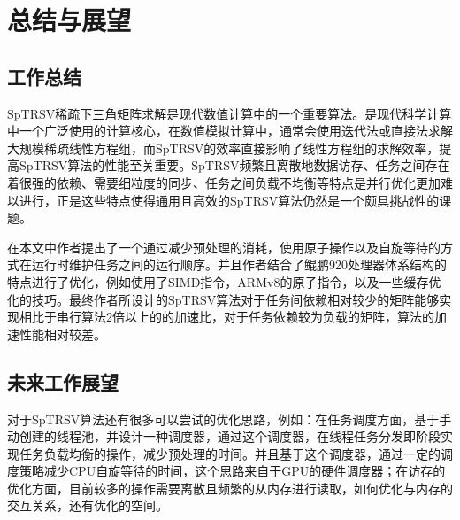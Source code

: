 \chapter{总结与展望}


\section{工作总结}

SpTRSV稀疏下三角矩阵求解是现代数值计算中的一个重要算法。是现代科学计算中一个广泛使用的计算核心，在数值模拟计算中，通常会使用迭代法或直接法求解大规模稀疏线性方程组，而SpTRSV的效率直接影响了线性方程组的求解效率，提高SpTRSV算法的性能至关重要。SpTRSV频繁且离散地数据访存、任务之间存在着很强的依赖、需要细粒度的同步、任务之间负载不均衡等特点是并行优化更加难以进行，正是这些特点使得通用且高效的SpTRSV算法仍然是一个颇具挑战性的课题。

在本文中作者提出了一个通过减少预处理的消耗，使用原子操作以及自旋等待的方式在运行时维护任务之间的运行顺序。并且作者结合了鲲鹏920处理器体系结构的特点进行了优化，例如使用了SIMD指令，ARMv8的原子指令，以及一些缓存优化的技巧。最终作者所设计的SpTRSV算法对于任务间依赖相对较少的矩阵能够实现相比于串行算法2倍以上的的加速比，对于任务依赖较为负载的矩阵，算法的加速性能相对较差。


\section{未来工作展望}

对于SpTRSV算法还有很多可以尝试的优化思路，例如：在任务调度方面，基于手动创建的线程池，并设计一种调度器，通过这个调度器，在线程任务分发即阶段实现任务负载均衡的操作，减少预处理的时间。并且基于这个调度器，通过一定的调度策略减少CPU自旋等待的时间，这个思路来自于GPU的硬件调度器；在访存的优化方面，目前较多的操作需要离散且频繁的从内存进行读取，如何优化与内存的交互关系，还有优化的空间。

\endinput